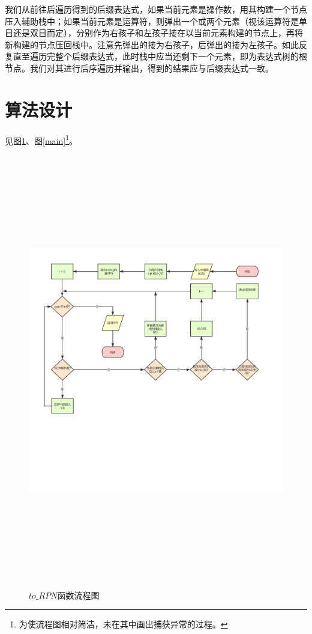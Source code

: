 \documentclass[UTF8]{ctexart}
\begin{document}
		\indent 我们从前往后遍历得到的后缀表达式，如果当前元素是操作数，用其构建一个节点压入辅助栈中；如果当前元素是运算符，则弹出一个或两个元素（视该运算符是单目还是双目而定），分别作为右孩子和左孩子接在以当前元素构建的节点上，再将新构建的节点压回栈中。注意先弹出的接为右孩子，后弹出的接为左孩子。如此反复直至遍历完整个后缀表达式，此时栈中应当还剩下一个元素，即为表达式树的根节点。我们对其进行后序遍历并输出，得到的结果应与后缀表达式一致。
		
		
	
	\section{算法设计}
	见图\ref{to RPN}、图\ref{main}\footnote{为使流程图相对简洁，未在其中画出捕获异常的过程。}。


\begin{figure}[H]
	\centering 
	\includegraphics[width=20cm, height=19cm]{to_RPN.pdf} 
	\caption{$to\_RPN$函数流程图} 
	\label{to RPN}
\end{figure}
\end{document}
